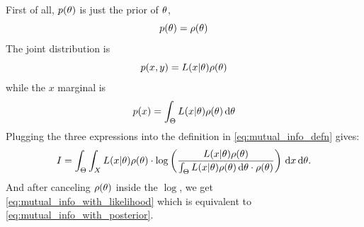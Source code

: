 \documentclass{article}
\begin{document}
First of all, $p({\theta})$  is just the prior of ${\theta}$, $$p({\theta}) = \rho({\theta})$$
The joint distribution is $$p(x,y) = L(x|{\theta})\rho({\theta})$$ while the $x$
marginal is $$p(x) = \int_\Theta L(x|{\theta})\rho({\theta}) \, \mathrm{d} {\theta}$$
Plugging the three expressions into the definition in
\cref{eq:mutual_info_defn} gives:
\begin{equation}
I = \int_\Theta \int_X L(x|{\theta})\rho({\theta}) \cdot 
\log \left( \frac{L(x|{\theta})\rho({\theta}) }{\int_\Theta L(x|{\theta})\rho({\theta}) \, \mathrm{d} {\theta}
\cdot \rho({\theta}) } \right)
\, \mathrm{d} x\, \mathrm{d} {\theta}.
\label{eq:mutual_info_prior_trajectory}
\end{equation}
And after canceling $\rho({\theta})$ inside the $\log$, we get
\cref{eq:mutual_info_with_likelihood} which is equivalent to
\cref{eq:mutual_info_with_posterior}.





% 
% 
% 


 
 

\end{document}
